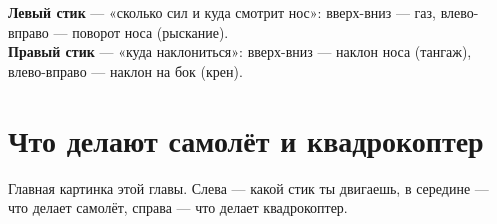 \begin{simple}
\textbf{Левый стик} --- «сколько сил и куда смотрит нос»: вверх-вниз --- газ,
влево-вправо --- поворот носа (рыскание).\\
\textbf{Правый стик} --- «куда наклониться»: вверх-вниз --- наклон носа (тангаж),
влево-вправо --- наклон на бок (крен).
\end{simple}

\section{Что делают самолёт и квадрокоптер}

Главная картинка этой главы. Слева --- какой стик ты двигаешь, в середине --- что делает
самолёт, справа --- что делает квадрокоптер.

\newcommand{\rowhead}[2]{\multicolumn{3}{@{}l@{}}{\colorbox{etx!10}{\makebox[\dimexpr\linewidth-2\fboxsep][l]{\sffamily\bfseries\color{etxdark}#1\hfill\mdseries\small #2}}}\\[2pt]}

